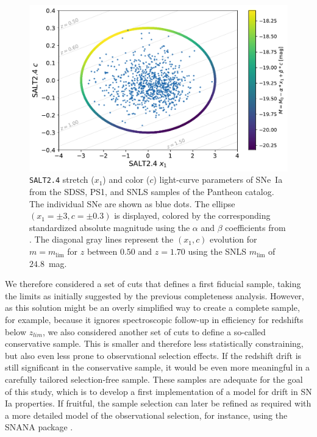 \documentclass[]{aa}
\begin{document}
\begin{figure}
    \centering
    \includegraphics[width=0.95\linewidth]{Article_figures/zmax_maglim_snls.pdf}
    \caption{\textsc{\texttt{SALT2.4}} stretch ($x_1$) and color ($c$)
        light-curve parameters of SNe~Ia from the SDSS, PS1, and SNLS samples of
        the Pantheon catalog. The individual SNe are shown as blue dots. The
        ellipse $(x_1=\pm3, c=\pm0.3)$ is displayed, colored by the
        corresponding standardized absolute magnitude using the $\alpha$ and
        $\beta$ coefficients from \cite{scolnic2018a}. The diagonal gray lines
        represent the $(x_1, c)$ evolution for $m = m_{\lim}$ for $z$ between
        $0.50$ and $z=1.70$ using the SNLS $m_{\lim}$ of $24.8$~mag.}
    \label{fig:maglim}
\end{figure}

We therefore considered a set of cuts that defines a first fiducial
    sample, taking the limits as initially suggested by the previous
    completeness analysis. However, as this solution might be an overly
    simplified way to create a complete sample, for example, because it ignores
    spectroscopic follow-up in efficiency for redshifts below $z_{lim}$, we
    also considered another set of cuts to define a so-called conservative
    sample. This is smaller and therefore less statistically constraining,
    but also even less prone to observational selection effects. If the redshift
    drift is still significant in the conservative sample, it would be even more
    meaningful in a carefully tailored selection-free sample. These samples are
    adequate for the goal of this study, which is to develop a first
    implementation of a model for drift in SN Ia properties. If fruitful, the
    sample selection can later be refined as required with a more detailed model
of the observational selection, for instance, using the SNANA package \citep{SNANA}.
\end{document}
